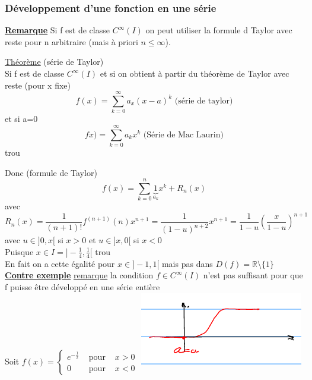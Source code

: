 \documentclass[12pt,a4paper]{article}
\newcommand{\somme}[2]{\ensuremath{\sum\limits_{#2}^{#1}}}
\newcommand{\limite}{\lim\limits_}
\newcommand{\evid}[1]{\textbf{\underline{#1}}}
\newcommand{\ninf}{\ensuremath{n \to \infty}}
\newcommand{\R}{\ensuremath{\mathbb{R}} }
\newcommand{\pour}{\mbox{ pour }}
\newcommand{\Theoreme}{\underline{Théorème} }
\begin{document}
{\subsubsection{Développement d'une fonction en une série}
\evid{Remarque} Si f  est de classe $C^\infty(I)$ on peut utiliser la formule d Taylor avec reste pour n arbitraire (mais à priori $n \leq \infty$).
\begin{boite}
	\Theoreme (série de Taylor)\\
	Si f est de classe $C^\infty(I)$ et si \fcolorbox{red}{white}{$\limite{\ninf}R_n(a,x) = 0$} on obtient à partir du théorème de Taylor avec reste (pour x fixe)
	\begin{equation}
	f(x) = \somme{\infty}{k=0}{a_x(x-a)^k} \text{ (série de taylor)}
	\end{equation}
	et si a=0
	\begin{equation}
		fx) = \somme{\infty}{k=0}{a_kx^k} \text{ (Série de Mac Laurin)}
	\end{equation}
	{trou}
\end{boite}
Donc (formule de Taylor)
\begin{equation}
	f(x) = \somme{n}{k=0}{\underbrace{1}_{a_k} x^k + R_n(x)}
\end{equation}
avec
\begin{equation}
	R_n(x) = \frac{1}{(n+1)!}f^{(n+1)}(n)x^{n+1} = \frac{1}{(1-u)^{n+2}}x^{n+1} = \frac{1}{1-u}\left(\frac{x}{1-u}\right)^{n+1}
\end{equation}
avec $u \in ]0,x[$ si $x>0$ et $u \in]x,0[$ si $x<0$\\
Puisque $x\in I = ]-\frac{1}{4}, \frac{1}{4}$[
{trou}\\
En fait on a cette égalité pour $x \in ]-1,1[$ mais pas dans $D(f) = \R\setminus\{1\}$
\evid{Contre exemple}
\underline{remarque} la condition $f \in C^\infty(I)$ n'est pas suffisant pour que f puisse être développé en une série entière\\
Soit $f(x) = \left\{\begin{array}{lll}
e^{-\frac{1}{x}} & \pour & x>0\\
0 & \pour & x<0
\end{array}\right.$
\includegraphics[scale=0.5]{illustrations_analyse/e_1_sur_x_2}\\
}
\end{document}
